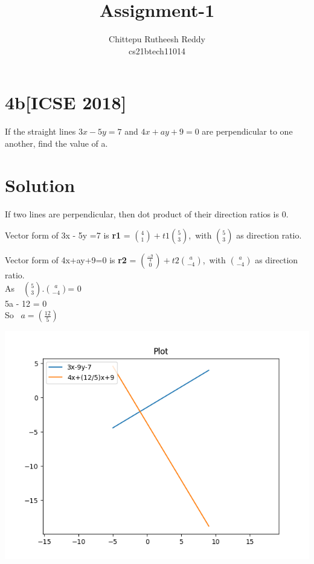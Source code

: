 \documentclass[18pt]{article}
\title{\textbf{Assignment-1}}
\author{Chittepu Rutheesh Reddy \\
  cs21btech11014}
\begin{document}
\maketitle{}

\section*{4b[ICSE 2018]}

If the straight lines $3x- 5y = 7$ and $4x+ ay+ 9 = 0$ are perpendicular to one 
another, find the value of a.

\section*{Solution}
If two lines are perpendicular, then dot product of their direction ratios is 0.
\bigskip

 Vector form of 3x - 5y =7 is \textbf{r1} = $\binom{4}{1} + t1\binom{5}{3}$,\, with $\binom{5}{3}$ as direction ratio.
 \bigskip
   
 Vector form of 4x+ay+9=0 is \textbf{r2} = $\binom{\frac{-9}{4}}{0} + t2\binom{a}{-4}$,\, with $\binom{a}{-4}$ as direction ratio.
  \\
   
   As  \,\,  $\binom{5}{3}$.$\binom{a}{-4}$= 0
   \\ 
   
    5a - 12 = 0 
  \\
 
   So  \,  $a = (\frac{12}{5})$ \\
  
  \graphicspath{{D:/Semester 2/Probability and Random Variables AI1110/Assignments/1/}}   
\includegraphics[scale=0.47]{Figure_1}
\end{document}
